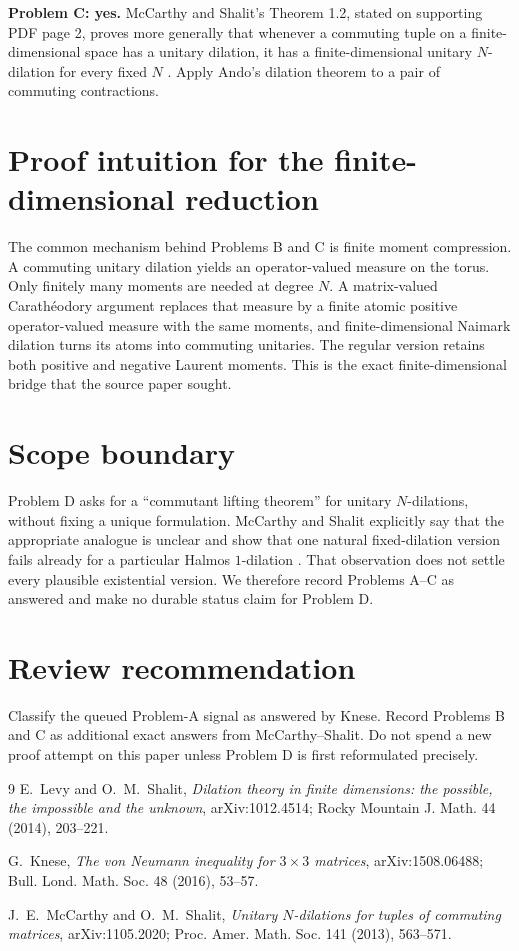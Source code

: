 \documentclass[11pt]{article}
\begin{document}
\textbf{Problem C: yes.}
McCarthy and Shalit's Theorem 1.2, stated on supporting PDF page 2, proves more
generally that whenever a commuting tuple on a finite-dimensional space has a
unitary dilation, it has a finite-dimensional unitary $N$-dilation for every
fixed $N$ \cite{MS}.  Apply Ando's dilation theorem to a pair of commuting
contractions.

\section*{Proof intuition for the finite-dimensional reduction}

The common mechanism behind Problems B and C is finite moment compression.
A commuting unitary dilation yields an operator-valued measure on the torus.
Only finitely many moments are needed at degree $N$.  A matrix-valued
Carath\'eodory argument replaces that measure by a finite atomic positive
operator-valued measure with the same moments, and finite-dimensional Naimark
dilation turns its atoms into commuting unitaries.  The regular version retains
both positive and negative Laurent moments.  This is the exact finite-dimensional
bridge that the source paper sought.

\section*{Scope boundary}

Problem D asks for a ``commutant lifting theorem'' for unitary $N$-dilations,
without fixing a unique formulation.  McCarthy and Shalit explicitly say that
the appropriate analogue is unclear and show that one natural fixed-dilation
version fails already for a particular Halmos $1$-dilation \cite[Sec.~2.3]{MS}.
That observation does not settle every plausible existential version.  We
therefore record Problems A--C as answered and make no durable status claim for
Problem D.

\section*{Review recommendation}

Classify the queued Problem-A signal as answered by Knese.  Record Problems B
and C as additional exact answers from McCarthy--Shalit.  Do not spend a new
proof attempt on this paper unless Problem D is first reformulated precisely.

\begin{thebibliography}{9}
E.~Levy and O.~M.~Shalit,
\emph{Dilation theory in finite dimensions: the possible, the impossible and
the unknown}, arXiv:1012.4514; Rocky Mountain J. Math. 44 (2014), 203--221.

G.~Knese,
\emph{The von Neumann inequality for $3\times3$ matrices},
arXiv:1508.06488; Bull. Lond. Math. Soc. 48 (2016), 53--57.

J.~E.~McCarthy and O.~M.~Shalit,
\emph{Unitary $N$-dilations for tuples of commuting matrices},
arXiv:1105.2020; Proc. Amer. Math. Soc. 141 (2013), 563--571.
\end{thebibliography}
\end{document}
